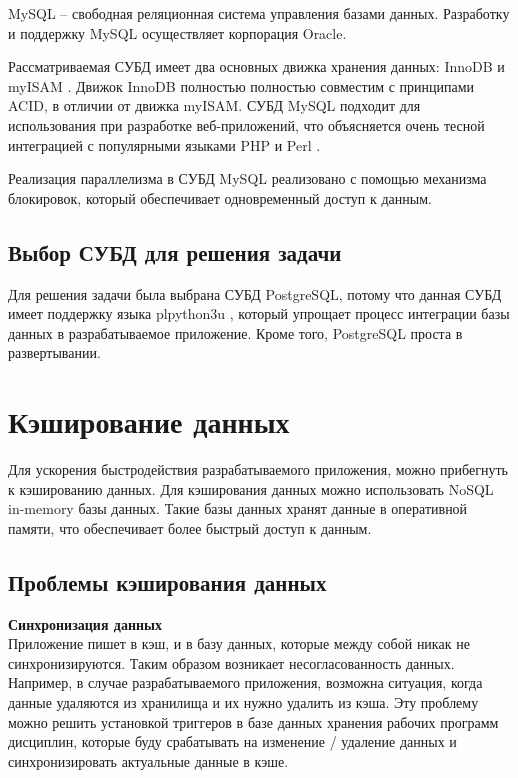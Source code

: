 MySQL \cite{mysql} -- свободная реляционная система управления базами данных. Разработку и поддержку MySQL осуществляет корпорация Oracle.

Рассматриваемая СУБД имеет два основных движка хранения данных: InnoDB \cite{innodb} и myISAM \cite{myisam}. Движок InnoDB полностью полностью совместим с принципами ACID, в отличии от движка myISAM. СУБД MySQL подходит  для использования при разработке веб-приложений, что объясняется очень тесной интеграцией с популярными языками PHP \cite{php} и Perl \cite{perl}.

Реализация параллелизма в СУБД MySQL реализовано с помощью механизма блокировок, который обеспечивает одновременный доступ к данным.

\subsection{Выбор СУБД для решения задачи}

Для решения задачи была выбрана СУБД PostgreSQL, потому что данная СУБД имеет поддержку языка plpython3u \cite{plpython3u}, который упрощает процесс интеграции базы данных в разрабатываемое приложение. Кроме того, PostgreSQL проста в развертывании.

\section{Кэширование данных}

Для ускорения быстродействия разрабатываемого приложения, можно прибегнуть к кэшированию данных. Для кэширования данных можно  использовать NoSQL \cite{nosql} in-memory базы данных. Такие базы данных хранят данные в оперативной памяти, что обеспечивает более быстрый доступ к данным.

\subsection{Проблемы кэширования данных}

\noindent\textbf{Синхронизация данных}\\

Приложение пишет в кэш, и в базу данных, которые между собой никак не синхронизируются. Таким образом возникает несогласованность данных. Например, в случае разрабатываемого приложения, возможна ситуация, когда данные удаляются из хранилища и их нужно удалить из
кэша. Эту проблему можно решить установкой триггеров в базе данных хранения рабочих программ дисциплин, которые буду срабатывать на изменение / удаление данных и синхронизировать актуальные данные в кэше.\\


